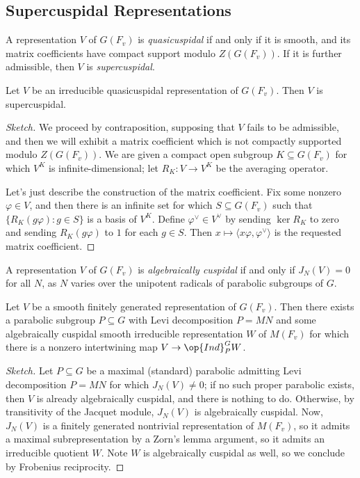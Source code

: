 \documentclass{article}
\begin{document}
\subsection{Supercuspidal Representations}
\begin{definition}
	A representation $V$ of $G(F_v)$ is \textit{quasicuspidal} if and only if it is smooth, and its matrix coefficients have compact support modulo $Z(G(F_v))$. If it is further admissible, then $V$ is \textit{supercuspidal}.
\end{definition}
\begin{proposition}
	Let $V$ be an irreducible quasicuspidal representation of $G(F_v)$. Then $V$ is supercuspidal.
\end{proposition}
\begin{proof}[Sketch]
	We proceed by contraposition, supposing that $V$ fails to be admissible, and then we will exhibit a matrix coefficient which is not compactly supported modulo $Z(G(F_v))$. We are given a compact open subgroup $K\subseteq G(F_v)$ for which $V^K$ is infinite-dimensional; let $R_K\colon V\to V^K$ be the averaging operator.

	Let's just describe the construction of the matrix coefficient. Fix some nonzero $\varphi\in V$, and then there is an infinite set for which $S\subseteq G(F_v)$ such that $\{R_K(g\varphi):g\in S\}$ is a basis of $V^K$. Define $\varphi^\lor\in V^\lor$ by sending $\ker R_K$ to zero and sending $R_K(g\varphi)$ to $1$ for each $g\in S$. Then $x\mapsto\langle x\varphi,\varphi^\lor\rangle$ is the requested matrix coefficient.
\end{proof}
\begin{definition}
	A representation $V$ of $G(F_v)$ is \textit{algebraically cuspidal} if and only if $J_N(V)=0$ for all $N$, as $N$ varies over the unipotent radicals of parabolic subgroups of $G$.
\end{definition}
\begin{proposition}
	Let $V$ be a smooth finitely generated representation of $G(F_v)$. Then there exists a para\-bolic subgroup $P\subseteq G$ with Levi decomposition $P=MN$ and some algebraically cuspidal smooth irreducible representation $W$ of $M(F_v)$ for which there is a nonzero intertwining map $V\to\op{Ind}_P^GW$.
\end{proposition}
\begin{proof}[Sketch]
	Let $P\subseteq G$ be a maximal (standard) parabolic admitting Levi decomposition $P=MN$ for which $J_N(V)\ne0$; if no such proper parabolic exists, then $V$ is already algebraically cuspidal, and there is nothing to do. Otherwise, by transitivity of the Jacquet module, $J_N(V)$ is algebraically cuspidal. Now, $J_N(V)$ is a finitely generated nontrivial representation of $M(F_v)$, so it admits a maximal subrepresentation by a Zorn's lemma argument, so it admits an irreducible quotient $W$. Note $W$ is algebraically cuspidal as well, so we conclude by Frobenius reciprocity.
\end{proof}
\end{document}
